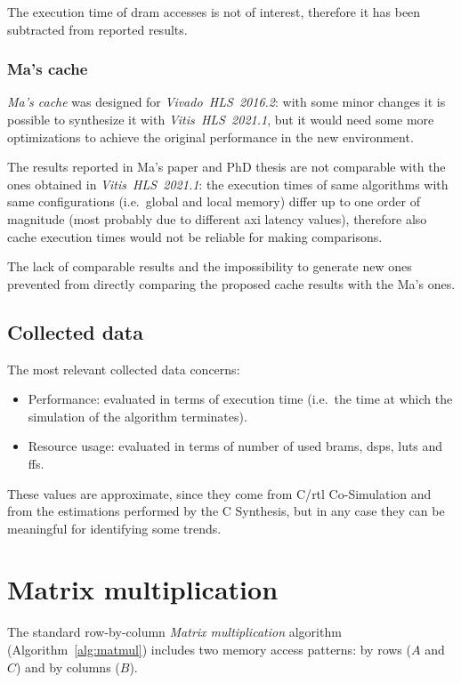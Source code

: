 \documentclass[11pt,a4paper,oneside]{memoir}
\begin{document}
The execution time of \ac{dram} accesses is not of interest, therefore it has
been subtracted from reported results.

\subsubsection{Ma's cache}
\emph{Ma's cache} was designed for \emph{Vivado\texttrademark~HLS~2016.2}:
with some minor changes it is possible to synthesize it with
\emph{Vitis~HLS~2021.1}, but it would need some more optimizations to achieve
the original performance in the new environment.

The results reported in Ma's paper  and PhD thesis
 are not comparable with the ones obtained in
\emph{Vitis~HLS~2021.1}: the execution times of same algorithms with same
configurations (i.e.\ global and local memory) differ up to one order of
magnitude (most probably due to different \ac{axi} latency values), therefore
also cache execution times would not be reliable for making comparisons.

The lack of comparable results and the impossibility to generate new ones
prevented from directly comparing the proposed cache results with the Ma's
ones.

\clearpage

\subsection{Collected data}
The most relevant collected data concerns:
\begin{itemize}
	\item Performance: evaluated in terms of execution time (i.e.\ the time
		at which the simulation of the algorithm terminates).
	\item Resource usage: evaluated in terms of number of used \acp{bram},
		\acp{dsp}, \acp{lut} and \acp{ff}.
\end{itemize}

These values are approximate, since they come from C/\ac{rtl} Co-Simulation and
from the estimations performed by the C Synthesis, but in any case they can be
meaningful for identifying some trends.

\clearpage

\section{Matrix multiplication}
The standard row-by-column \emph{Matrix multiplication} algorithm
(Algorithm~\ref{alg:matmul}) includes two memory access patterns: by rows ($A$
and $C$) and by columns ($B$).
\end{document}
